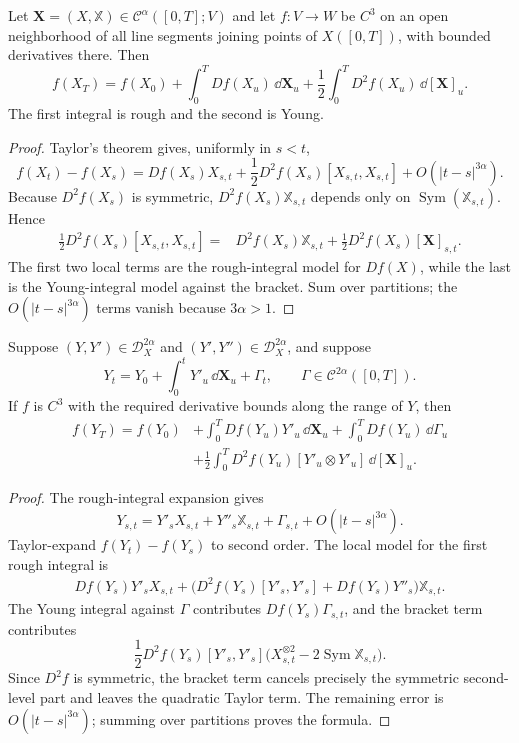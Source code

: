 \begin{thm}
Let $\mathbf X=(X,\mathbb X)\in\mathscr C^\alpha([0,T];V)$ and let
$f\colon V\to W$ be $C^3$ on an open neighborhood of all line segments joining
points of $X([0,T])$, with bounded derivatives there.  Then
\[
  f(X_T)=f(X_0)
  +\int_0^T Df(X_u)\,\dd\mathbf X_u
  +\frac12\int_0^T D^2f(X_u)\,\dd[\mathbf X]_u.
\]
The first integral is rough and the second is Young.
\end{thm}

\begin{proof}
Taylor's theorem gives, uniformly in $s<t$,
\[
 f(X_t)-f(X_s)
 =Df(X_s)X_{s,t}
  +\frac12D^2f(X_s)[X_{s,t},X_{s,t}]
  +O(|t-s|^{3\alpha}).
\]
Because $D^2f(X_s)$ is symmetric,
$D^2f(X_s)\mathbb X_{s,t}$ depends only on
$\operatorname{Sym}(\mathbb X_{s,t})$.  Hence
\begin{align*}
\frac12D^2f(X_s)[X_{s,t},X_{s,t}]
={}&D^2f(X_s)\mathbb X_{s,t}
 +\frac12D^2f(X_s)[\mathbf X]_{s,t}.
\end{align*}
The first two local terms are the rough-integral model for $Df(X)$, while the
last is the Young-integral model against the bracket.  Sum over partitions;
the $O(|t-s|^{3\alpha})$ terms vanish because $3\alpha>1$.
\end{proof}

\begin{cor}
Suppose $(Y,Y')\in\mathscr D_X^{2\alpha}$ and
$(Y',Y'')\in\mathscr D_X^{2\alpha}$, and suppose
\[
  Y_t=Y_0+\int_0^tY'_u\,\dd\mathbf X_u+\Gamma_t,
  \qquad \Gamma\in\mathcal C^{2\alpha}([0,T]).
\]
If $f$ is $C^3$ with the required derivative bounds along the range of $Y$,
then
\begin{align*}
f(Y_T)=f(Y_0)
&+\int_0^T Df(Y_u)Y'_u\,\dd\mathbf X_u
 +\int_0^T Df(Y_u)\,\dd\Gamma_u\\
&+\frac12\int_0^T
 D^2f(Y_u)[Y'_u\otimes Y'_u] \,\dd[\mathbf X]_u.
\end{align*}
\end{cor}

\begin{proof}
The rough-integral expansion gives
\[
  Y_{s,t}=Y'_sX_{s,t}+Y''_s\mathbb X_{s,t}
           +\Gamma_{s,t}+O(|t-s|^{3\alpha}).
\]
Taylor-expand $f(Y_t)-f(Y_s)$ to second order.  The local model for the first
rough integral is
\begin{align*}
 Df(Y_s)Y'_sX_{s,t}
 +\bigl(D^2f(Y_s)[Y'_s,Y'_s]+Df(Y_s)Y''_s\bigr)\mathbb X_{s,t}.
\end{align*}
The Young integral against $\Gamma$ contributes $Df(Y_s)\Gamma_{s,t}$, and
the bracket term contributes
\[
 \frac12D^2f(Y_s)[Y'_s,Y'_s]
 \bigl(X_{s,t}^{\otimes2}-2\operatorname{Sym}\mathbb X_{s,t}\bigr).
\]
Since $D^2f$ is symmetric, the bracket term cancels precisely the symmetric
second-level part and leaves the quadratic Taylor term.  The remaining error is
$O(|t-s|^{3\alpha})$; summing over partitions proves the formula.
\end{proof}

